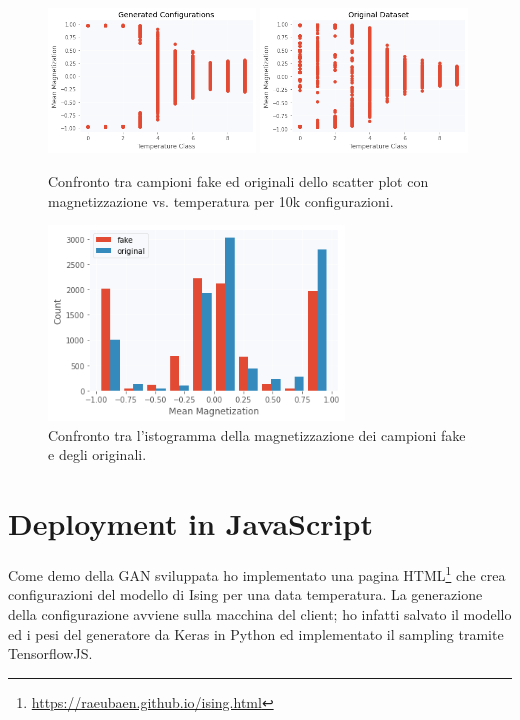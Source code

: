 \documentclass[Lau, noexaminfo, oneside]{sapthesis} %
\begin{document}
\begin{figure}[H]
\includegraphics[width=0.49\textwidth]{fakescatter.png}
\includegraphics[width=0.49\textwidth]{origscatter.png}
\centering
\caption{Confronto tra campioni fake ed originali dello scatter plot con magnetizzazione vs. temperatura per 10k configurazioni.}
\end{figure}
\begin{figure}[H]
\includegraphics[width=0.7\textwidth]{hist.png}
\centering
\caption{Confronto tra l'istogramma della magnetizzazione dei campioni fake e degli originali.}
\end{figure}
\section{Deployment in JavaScript}
Come demo della GAN sviluppata ho implementato una pagina HTML\footnote{\url{https://raeubaen.github.io/ising.html}} che crea configurazioni del modello di Ising per una data temperatura. La generazione della configurazione avviene sulla macchina del client; ho infatti salvato il modello ed i pesi del generatore da Keras in Python ed implementato il sampling tramite TensorflowJS.
\newpage
\nocite{reference}
{}

\end{document}
